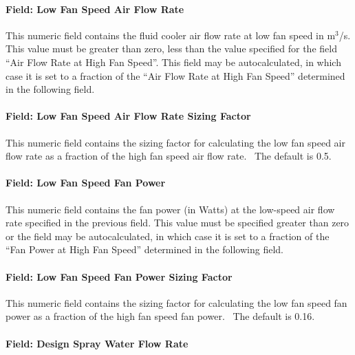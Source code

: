 \paragraph{Field: Low Fan Speed Air Flow Rate}\label{field-low-fan-speed-air-flow-rate-1}

This numeric field contains the fluid cooler air flow rate at low fan speed in m\(^{3}\)/s. This value must be greater than zero, less than the value specified for the field ``Air Flow Rate at High Fan Speed''. This field may be autocalculated, in which case it is set to a fraction of the ``Air Flow Rate at High Fan Speed'' determined in the following field.

\paragraph{Field: Low Fan Speed Air Flow Rate Sizing Factor}\label{field-low-fan-speed-air-flow-rate-sizing-factor-1}

This numeric field contains the sizing factor for calculating the low fan speed air flow rate as a fraction of the high fan speed air flow rate.~ The default is 0.5.

\paragraph{Field: Low Fan Speed Fan Power}\label{field-low-fan-speed-fan-power-1}

This numeric field contains the fan power (in Watts) at the low-speed air flow rate specified in the previous field. This value must be specified greater than zero or the field may be autocalculated, in which case it is set to a fraction of the ``Fan Power at High Fan Speed'' determined in the following field.

\paragraph{Field: Low Fan Speed Fan Power Sizing Factor}\label{field-low-fan-speed-fan-power-sizing-factor-1}

This numeric field contains the sizing factor for calculating the low fan speed fan power as a fraction of the high fan speed fan power. ~The default is 0.16.

\paragraph{Field: Design Spray Water Flow Rate}\label{field-design-spray-water-flow-rate-1}

